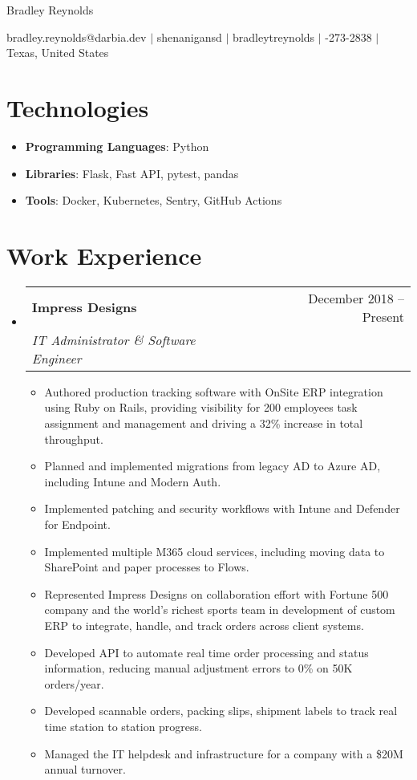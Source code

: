 \documentclass[letterpaper,11pt]{article}
\makeatletter
\newcommand{\resumeItem}[1]{
  \item\small{
    {#1 \vspace{-2pt}}
  }
}
\newcommand{\resumeSubheading}[4]{
  \vspace{-2pt}\item
    \begin{tabular*}{0.97\textwidth}[t]{l@{\extracolsep{\fill}}r}
      \textbf{#1} & #2 \\
      \textit{\small#3} & \textit{\small #4} \\
    \end{tabular*}\vspace{-7pt}
}
\newcommand{\resumeSubItem}[1]{\resumeItem{#1}\vspace{-4pt}}
\newcommand{\resumeSubheadingListStart}{\begin{itemize}[leftmargin=0.15in, label={}]}
\newcommand{\resumeSubheadingListEnd}{\end{itemize}}
\newcommand{\resumeItemListStart}{\begin{itemize}}
\newcommand{\resumeItemListEnd}{\end{itemize}}
\newcommand{\myemail}{bradley.reynolds@darbia.dev}
\newcommand{\myname}{Bradley Reynolds}
\newcommand{\mygh}{shenanigansd}
\newcommand{\mylinkedin}{bradleytreynolds}
\newcommand{\myphone}{940-273-2838}
\newcommand{\mylocation}{Texas, United States}
\newcommand{\myemail}{bradley.reynolds@darbia.dev}
\newcommand{\myname}{Bradley Reynolds}
\newcommand{\mygh}{shenanigansd}
\newcommand{\mylinkedin}{bradleytreynolds}
\newcommand{\myphone}{940-273-2838}
\newcommand{\mylocation}{Texas, United States}
\makeatother
\begin{document}
{\Huge \myname}
\\
\vspace{2pt}

\small{
    \faEnvelope
    \thinspace \thinspace
    \myemail
    \thinspace \thinspace $|$
    \faGithub
    \thinspace \thinspace
    \mygh
    \thinspace \thinspace $|$
    \faLinkedin
    \thinspace \thinspace
    \mylinkedin
    \thinspace \thinspace $|$
    \faPhone
    \thinspace \thinspace
    \myphone
    \thinspace \thinspace $|$
    \thinspace \thinspace
    \mylocation
}

\vspace{-11pt}

\section{Technologies}
\resumeSubheadingListStart
    \resumeSubItem{\textbf{Programming Languages}{:
        Python
    }} \\
    \resumeSubItem{\textbf{Libraries}{:
        Flask,
        Fast API,
        pytest,
        pandas
    }} \\
    \resumeSubItem{\textbf{Tools}{:
        Docker,
        Kubernetes,
        Sentry,
        GitHub Actions
    }}
\resumeSubheadingListEnd

\section{Work Experience}
    \resumeSubheadingListStart
        \resumeSubheading{Impress Designs}{December 2018 -- Present}{IT Administrator \& Software Engineer}{}
        \resumeItemListStart
            \resumeItem{Authored production tracking software with OnSite ERP integration using Ruby on Rails, providing visibility for 200 employees task assignment and management and driving a 32\% increase in total throughput.}
            \resumeItem{Planned and implemented migrations from legacy AD to Azure AD, including Intune and Modern Auth.}
            \resumeItem{Implemented patching and security workflows with Intune and Defender for Endpoint.}
            \resumeItem{Implemented multiple M365 cloud services, including moving data to SharePoint and paper processes to Flows.}
            \resumeItem{Represented Impress Designs on collaboration effort with Fortune 500 company and the world's richest sports team in development of custom ERP to integrate, handle, and track orders across client systems.}
            \resumeItem{Developed API to automate real time order processing and status information, reducing manual adjustment errors to 0\% on 50K orders/year.}
            \resumeItem{Developed scannable orders, packing slips, shipment labels to track real time station to station progress.}
            \resumeItem{Managed the IT helpdesk and infrastructure for a company with a \$20M annual turnover.}
        \resumeItemListEnd
    \resumeSubheadingListEnd
\end{document}

